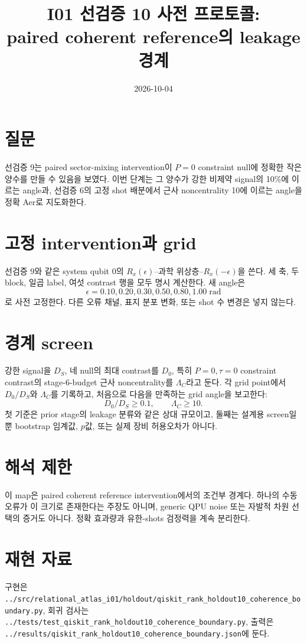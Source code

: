 \documentclass[11pt]{article}
\begin{document}
\title{I01 선검증 10 사전 프로토콜:\\
paired coherent reference의 leakage 경계}
\date{2026-10-04}
\maketitle

\section*{질문}
선검증 9는 paired sector-mixing intervention이 $P=0$ constraint null에
정확한 작은 양수를 만들 수 있음을 보였다. 이번 단계는 그 양수가 강한
비제약 signal의 10\%에 이르는 angle과, 선검증 6의 고정 shot 배분에서
근사 noncentrality 10에 이르는 angle을 정확 Aer로 지도화한다.

\section*{고정 intervention과 grid}
선검증 9와 같은 system qubit 0의
$R_x(\epsilon)$--과학 위상층--$R_x(-\epsilon)$을 쓴다. 세 축, 두 block,
일곱 label, 여섯 contrast 행을 모두 명시 계산한다. 새 angle은
\[
 \epsilon=0.10,0.20,0.30,0.50,0.80,1.00\;\mathrm{rad}
\]
로 사전 고정한다. 다른 오류 채널, 표지 분포 변화, 또는 shot 수 변경은 넣지 않는다.

\section*{경계 screen}
강한 signal을 $D_S$, 네 null의 최대 contrast를 $D_0$, 특히
$P=0,\tau=0$ constraint contrast의 stage-6-budget 근사 noncentrality를
$\Lambda_C$라고 둔다. 각 grid point에서 $D_0/D_S$와 $\Lambda_C$를 기록하고,
처음으로 다음을 만족하는 grid angle을 보고한다:
\[
 D_0/D_S\ge0.1,\qquad \Lambda_C\ge10.
\]
첫 기준은 prior stage의 leakage 분류와 같은 상대 규모이고, 둘째는 설계용
screen일 뿐 bootstrap 임계값, $p$값, 또는 실제 장비 허용오차가 아니다.

\section*{해석 제한}
이 map은 paired coherent reference intervention에서의 조건부 경계다. 하나의
수동 오류가 이 크기로 존재한다는 주장도 아니며, generic QPU noise 또는
자발적 차원 선택의 증거도 아니다. 정확 효과량과 유한-shots 검정력을 계속
분리한다.

\section*{재현 자료}
구현은 \texttt{../src/relational\_atlas\_i01/holdout/qiskit\_rank\_holdout10\_coherence\_boundary.py},
회귀 검사는 \texttt{../tests/test\_qiskit\_rank\_holdout10\_coherence\_boundary.py},
출력은 \texttt{../results/qiskit\_rank\_holdout10\_coherence\_boundary.json}에 둔다.
\end{document}
